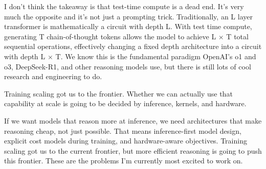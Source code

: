 \documentclass[12pt]{article}
\begin{document}
I don't think the takeaway is that test-time compute is a dead end. It's very much the opposite and it's not just a prompting trick. Traditionally, an L layer transformer is mathematically a circuit with depth L. With test time compute, generating T chain-of-thought tokens allows the model to achieve L $\times$ T total sequential operations, effectively changing a fixed depth architecture into a circuit with depth L $\times$ T. We know this is the fundamental paradigm OpenAI's o1 and o3, DeepSeek-R1, and other reasoning models use, but there is still lots of cool research and engineering to do.

Training scaling got us to the frontier. Whether we can actually use that capability at scale is going to be decided by inference, kernels, and hardware.

If we want models that reason more at inference, we need architectures that make reasoning cheap, not just possible. That means inference-first model design, explicit cost models during training, and hardware-aware objectives. Training scaling got us to the current frontier, but more efficient reasoning is going to push this frontier. These are the problems I'm currently most excited to work on.
\end{document}
